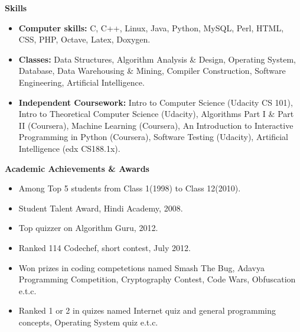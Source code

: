 \documentclass[letterpaper,10pt]{article}
\newcommand{\resheading}[1]{{\large \colorbox{mygrey}{\begin{minipage}{\textwidth}{\textbf{#1 \vphantom{p\^{E}}}}\end{minipage}}}}
\begin{document}
\resheading{Skills}
\begin{itemize}
\item \textbf{Computer skills:} C, C++, Linux, Java, Python, MySQL, Perl, HTML, CSS, PHP, Octave, Latex, Doxygen. 
\item \textbf{Classes:} Data Structures, Algorithm Analysis \& Design, Operating System, Database, Data Warehousing \& Mining, Compiler Construction, Software Engineering, Artificial Intelligence.
\item \textbf{Independent Coursework:} Intro to Computer Science (Udacity CS 101), Intro to Theoretical Computer Science (Udacity), Algorithms Part I \& Part II (Coursera), Machine Learning (Coursera), An Introduction to Interactive Programming in Python (Coursera), Software Testing (Udacity), Artificial Intelligence (edx CS188.1x).
\end{itemize}

\resheading{Academic Achievements \& Awards}
\begin{itemize}
	\item Among Top 5 students from Class 1(1998) to Class 12(2010).
	\item Student Talent Award, Hindi Academy, 2008.
	\item Top quizzer on Algorithm Guru, 2012.
	\item Ranked 114 Codechef, short contest, July 2012.
	\item Won prizes in coding competetions named Smash The Bug, Adavya Programming Competition, Cryptography Contest, Code Wars, Obfuscation e.t.c.
	\item Ranked 1 or 2  in quizes named Internet quiz and general programming concepts, Operating System quiz e.t.c.

\end{itemize}
\end{document}
